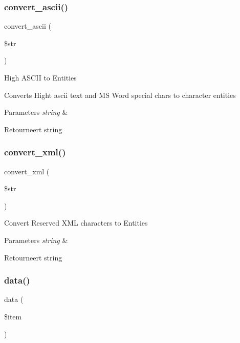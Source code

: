 \subsubsection{\texorpdfstring{convert\_ascii()}{convert\_ascii()}}
{\footnotesize\ttfamily convert\+\_\+ascii (\begin{DoxyParamCaption}\item[{}]{\$str }\end{DoxyParamCaption})}

High A\+S\+C\+II to Entities

Converts Hight ascii text and MS Word special chars to character entities


\begin{DoxyParams}{Parameters}
{\em string} & \\
\hline
\end{DoxyParams}
\begin{DoxyReturn}{Retourneert}
string 
\end{DoxyReturn}
\mbox{\label{class_c_i___trackback_a1ec67af2037561b65ffe49b59727cb53}} 
\subsubsection{\texorpdfstring{convert\_xml()}{convert\_xml()}}
{\footnotesize\ttfamily convert\+\_\+xml (\begin{DoxyParamCaption}\item[{}]{\$str }\end{DoxyParamCaption})}

Convert Reserved X\+ML characters to Entities


\begin{DoxyParams}{Parameters}
{\em string} & \\
\hline
\end{DoxyParams}
\begin{DoxyReturn}{Retourneert}
string 
\end{DoxyReturn}
\mbox{\label{class_c_i___trackback_a4d04a7a984a4bcc71e27be87706f393c}} 
\subsubsection{\texorpdfstring{data()}{data()}}
{\footnotesize\ttfamily data (\begin{DoxyParamCaption}\item[{}]{\$item }\end{DoxyParamCaption})}

